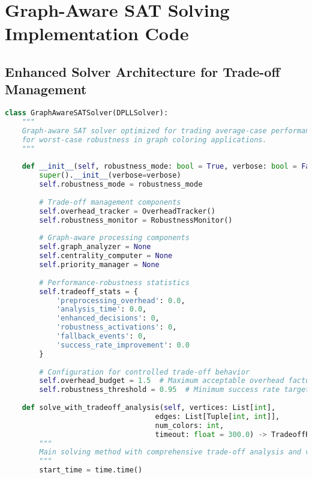 \appendix

\section{Graph-Aware SAT Solving Implementation Code}
\label{appendix:graph-aware-implementation}

\subsection{Enhanced Solver Architecture for Trade-off Management}
\label{appendix:enhanced-solver-architecture}

\begin{lstlisting}[language=Python, caption=Enhanced Solver Architecture for Performance-Robustness Trade-offs]
class GraphAwareSATSolver(DPLLSolver):
    """
    Graph-aware SAT solver optimized for trading average-case performance 
    for worst-case robustness in graph coloring applications.
    """
    
    def __init__(self, robustness_mode: bool = True, verbose: bool = False):
        super().__init__(verbose=verbose)
        self.robustness_mode = robustness_mode
        
        # Trade-off management components
        self.overhead_tracker = OverheadTracker()
        self.robustness_monitor = RobustnessMonitor()
        
        # Graph-aware processing components
        self.graph_analyzer = None
        self.centrality_computer = None
        self.priority_manager = None
        
        # Performance-robustness statistics
        self.tradeoff_stats = {
            'preprocessing_overhead': 0.0,
            'analysis_time': 0.0,
            'enhanced_decisions': 0,
            'robustness_activations': 0,
            'fallback_events': 0,
            'success_rate_improvement': 0.0
        }
        
        # Configuration for controlled trade-off behavior
        self.overhead_budget = 1.5  # Maximum acceptable overhead factor
        self.robustness_threshold = 0.95  # Minimum success rate target
        
    def solve_with_tradeoff_analysis(self, vertices: List[int], 
                                   edges: List[Tuple[int, int]], 
                                   num_colors: int, 
                                   timeout: float = 300.0) -> TradeoffResult:
        """
        Main solving method with comprehensive trade-off analysis and validation.
        """
        start_time = time.time()
        

\end{lstlisting}
